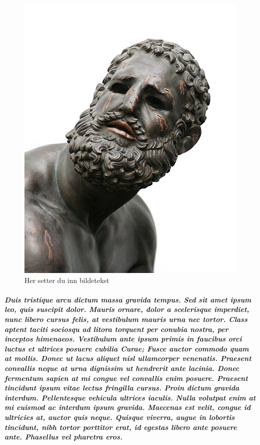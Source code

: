 \documentclass[titlepage,norsk]{article}
\begin{document}
\begin{figure}[p]
\centering
\includegraphics[scale=0.10]{img/pic.jpg}
\caption{Her setter du inn bildetekst}
\label{fig:awesome_image}
\end{figure}


\subparagraph{
Duis tristique arcu dictum massa gravida tempus. Sed sit amet ipsum leo, quis suscipit dolor. Mauris ornare, dolor a scelerisque imperdiet, nunc libero cursus felis, at vestibulum mauris urna nec tortor. Class aptent taciti sociosqu ad litora torquent per conubia nostra, per inceptos himenaeos. Vestibulum ante ipsum primis in faucibus orci luctus et ultrices posuere cubilia Curae; Fusce auctor commodo quam at mollis. Donec ut lacus aliquet nisl ullamcorper venenatis. Praesent convallis neque at urna dignissim ut hendrerit ante lacinia. Donec fermentum sapien at mi congue vel convallis enim posuere. Praesent tincidunt ipsum vitae lectus fringilla cursus. Proin dictum gravida interdum. Pellentesque vehicula ultrices iaculis. Nulla volutpat enim at mi euismod ac interdum ipsum gravida. Maecenas est velit, congue id ultricies at, auctor quis neque. Quisque viverra, augue in lobortis tincidunt, nibh tortor porttitor erat, id egestas libero ante posuere ante. Phasellus vel pharetra eros.
}

\appendices
\end{document}
